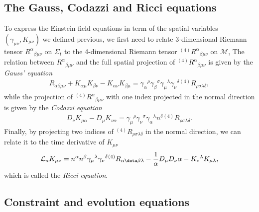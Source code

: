 \subsection{The Gauss, Codazzi and Ricci equations}
\label{section1.2.4}

To express the Einstein field equations in term of the spatial variables $(\gamma_{\mu\nu}, K_{\mu\nu})$ we defined previous,
we first need to relate 3-dimensional Riemann tensor $R^\alpha{}_{\beta\mu\nu}$ on $\Sigma_t$ to the 4-dimensional Riemann tensor ${}^{(4)}R^\alpha{}_{\beta\mu\nu}$ on $\mathcal{M}$,
The relation between $R^\alpha{}_{\beta\mu\nu}$ and the full spatial projection of ${}^{(4)}R^\alpha{}_{\beta\mu\nu}$ is given by the \textit{Gauss' equation}
\begin{align}\label{eq:Gauss}
    R_{\alpha\beta\mu\nu} + K_{\alpha\mu}K_{\beta\nu} - K_{\alpha\nu} K_{\beta\mu} = \gamma_{\alpha}{}^{\rho} \gamma_{\beta}{}^{\sigma} \gamma_{\mu}{}^{\lambda} \gamma_{\nu}{}^{\delta} {}^{(4)}R_{\rho\sigma\lambda\delta},
\end{align}
while the projection of ${}^{(4)}R^\alpha{}_{\beta\mu\nu}$ with one index projected in the normal direction is given by the \textit{Codazzi equation}
\begin{align}\label{eq:Codazzi}
    D_{\nu} K_{\mu\alpha} - D_{\mu} K_{\nu\alpha} = \gamma_{\mu}{}^{\rho} \gamma_{\nu}{}^{\sigma} \gamma_{\alpha}{}^{\lambda} n^{\delta} {}^{(4)}R_{\rho\sigma\lambda\delta}.
\end{align}
Finally, by projecting two indices of ${}^{(4)}R_{\rho\sigma\lambda\delta}$ in the normal direction,
we can relate it to the time derivative of $K_{\mu\nu}$
\begin{align}\label{eq:Ricci}
    \mathcal{L}_n K_{\mu\nu} = n^{\alpha} n^{\beta} \gamma_{\mu}{}^{\lambda} \gamma_{\nu}{}^{\delta} {}^{(4)}R_{\alpha\deta\beta\lambda} - \frac{1}{\alpha} D_{\mu} D_\nu \alpha - K_{\nu}{}^{\lambda}K_{\mu\lambda},
\end{align}
which is called the \textit{Ricci equation}.

\subsection{Constraint and evolution equations} %
\label{section1.2.5}

